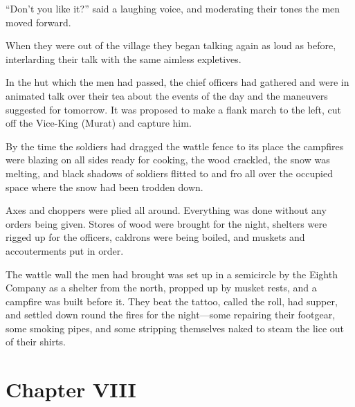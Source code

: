 ``Don't you like it?'' said a laughing voice, and moderating
their tones the men moved forward.

When they were out of the village they began talking again as
loud as before, interlarding their talk with the same aimless
expletives.

In the hut which the men had passed, the chief officers had
gathered and were in animated talk over their tea about the
events of the day and the maneuvers suggested for tomorrow. It
was proposed to make a flank march to the left, cut off the
Vice-King (Murat) and capture him.

By the time the soldiers had dragged the wattle fence to its
place the campfires were blazing on all sides ready for cooking,
the wood crackled, the snow was melting, and black shadows of
soldiers flitted to and fro all over the occupied space where the
snow had been trodden down.

Axes and choppers were plied all around. Everything was done
without any orders being given. Stores of wood were brought for
the night, shelters were rigged up for the officers, caldrons
were being boiled, and muskets and accouterments put in order.

The wattle wall the men had brought was set up in a semicircle by
the Eighth Company as a shelter from the north, propped up by
musket rests, and a campfire was built before it. They beat the
tattoo, called the roll, had supper, and settled down round the
fires for the night---some repairing their footgear, some smoking
pipes, and some stripping themselves naked to steam the lice out
of their shirts.


\chapter*{Chapter VIII}
\ifaudio 
{}
\fi

